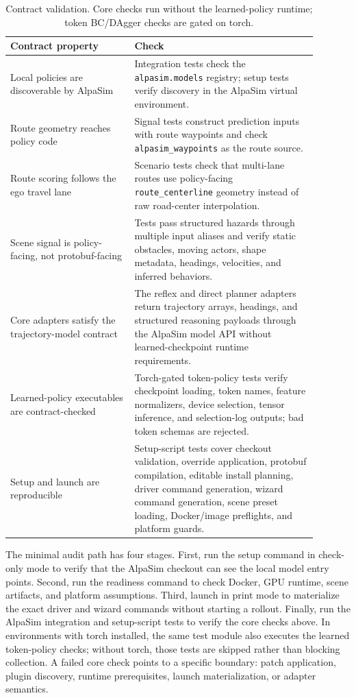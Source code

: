 \documentclass{article}
\begin{document}
\begin{table}[t]
\centering
\small
\begin{tabular}{p{0.36\linewidth}p{0.53\linewidth}}
\toprule
Contract property & Check \\
\midrule
Local policies are discoverable by AlpaSim &
Integration tests check the \texttt{alpasim.models} registry; setup tests verify
discovery in the AlpaSim virtual environment. \\
Route geometry reaches policy code &
Signal tests construct prediction inputs with route waypoints and check
\texttt{alpasim\_waypoints} as the route source. \\
Route scoring follows the ego travel lane &
Scenario tests check that multi-lane routes use policy-facing
\texttt{route\_centerline} geometry instead of raw road-center interpolation. \\
Scene signal is policy-facing, not protobuf-facing &
Tests pass structured hazards through multiple input aliases and verify static
obstacles, moving actors, shape metadata, headings, velocities, and inferred behaviors. \\
Core adapters satisfy the trajectory-model contract &
The reflex and direct planner adapters return trajectory arrays, headings, and
structured reasoning payloads through the AlpaSim model API without learned-checkpoint
runtime requirements. \\
Learned-policy executables are contract-checked &
Torch-gated token-policy tests verify checkpoint loading, token names, feature
normalizers, device selection, tensor inference, and selection-log outputs; bad token
schemas are rejected. \\
Setup and launch are reproducible &
Setup-script tests cover checkout validation, override application, protobuf
compilation, editable install planning, driver command generation, wizard command
generation, scene preset loading, Docker/image preflights, and platform guards. \\
\bottomrule
\end{tabular}
\caption{Contract validation. Core checks run without the learned-policy runtime; token
BC/DAgger checks are gated on torch.}
\label{tab:artifact_validation}
\end{table}

The minimal audit path has four stages. First, run the setup command in
check-only mode to verify that the AlpaSim checkout can see the local model entry points.
Second, run the readiness command to check Docker, GPU runtime, scene artifacts, and
platform assumptions. Third, launch in print mode to materialize the exact driver and
wizard commands without starting a rollout. Finally, run the AlpaSim integration and
setup-script tests to verify the core checks above. In environments with torch installed,
the same test module also executes the learned token-policy checks; without torch, those
tests are skipped rather than blocking collection. A failed core check points to a
specific boundary: patch application, plugin discovery, runtime prerequisites, launch
materialization, or adapter semantics.
\end{document}
